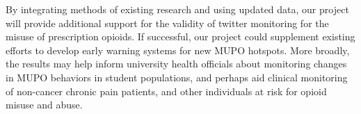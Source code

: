 \documentclass[sigconf]{acmart}
\begin{document}
By integrating methods of existing research and using updated data, our project
will provide additional support for the validity of twitter monitoring for the
misuse of prescription opioids. If successful, our project could supplement 
existing efforts to develop early warning systems for new MUPO hotspots. More 
broadly, the results may help inform university health officials about
monitoring changes in MUPO behaviors in student populations, and perhaps aid 
clinical monitoring of non-cancer chronic pain patients, and other individuals 
at risk for opioid misuse and abuse. 
 






 

%
\end{document}
